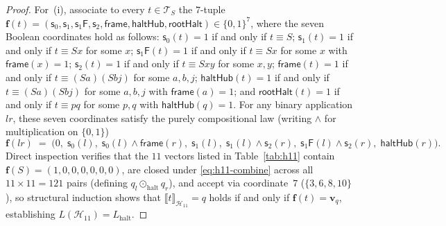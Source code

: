 \documentclass[11pt,reqno]{amsart}
\numberwithin{equation}{section}
\theoremstyle{plain}
\theoremstyle{definition}
\theoremstyle{remark}
\newcommand{\TS}{\mathcal{T}_S}
\newcommand{\sem}[1]{\llbracket #1 \rrbracket}
\begin{document}
\begin{proof}
For~(i), associate to every $t \in \TS$ the $7$-tuple $\mathbf{f}(t) = (\mathsf{s}_0, \mathsf{s}_1, \mathsf{s}_1\mathsf{F}, \mathsf{s}_2, \mathsf{frame}, \mathsf{haltHub}, \mathsf{rootHalt}) \in \{0,1\}^7$, where the seven Boolean coordinates hold as follows: $\mathsf{s}_0(t) = 1$ if and only if $t \equiv S$; $\mathsf{s}_1(t) = 1$ if and only if $t \equiv S x$ for some $x$; $\mathsf{s}_1\mathsf{F}(t) = 1$ if and only if $t \equiv S x$ for some $x$ with $\mathsf{frame}(x) = 1$; $\mathsf{s}_2(t) = 1$ if and only if $t \equiv S x y$ for some $x, y$; $\mathsf{frame}(t) = 1$ if and only if $t \equiv (S a)(S b j)$ for some $a, b, j$; $\mathsf{haltHub}(t) = 1$ if and only if $t \equiv (S a)(S b j)$ for some $a, b, j$ with $\mathsf{frame}(a) = 1$; and $\mathsf{rootHalt}(t) = 1$ if and only if $t \equiv p q$ for some $p, q$ with $\mathsf{haltHub}(q) = 1$. For any binary application $l r$, these seven coordinates satisfy the purely compositional law (writing $\land$ for multiplication on $\{0,1\}$)
\begin{equation}\label{eq:h11-combine}
  \mathbf{f}(l r) \;=\; \bigl(0,\; \mathsf{s}_0(l),\; \mathsf{s}_0(l)\land\mathsf{frame}(r),\; \mathsf{s}_1(l),\; \mathsf{s}_1(l)\land\mathsf{s}_2(r),\; \mathsf{s}_1\mathsf{F}(l)\land\mathsf{s}_2(r),\; \mathsf{haltHub}(r)\bigr).
\end{equation}
Direct inspection verifies that the $11$ vectors listed in Table~\ref{tab:h11} contain $\mathbf{f}(S) = (1,0,0,0,0,0,0)$, are closed under \eqref{eq:h11-combine} across all $11 \times 11 = 121$ pairs (defining $q_l \odot_{\mathrm{halt}} q_r$), and accept via coordinate~$7$ ($\{3,6,8,10\}$), so structural induction shows that $\sem{t}_{\mathcal{H}_{11}} = q$ holds if and only if $\mathbf{f}(t) = \mathbf{v}_q$, establishing $L(\mathcal{H}_{11}) = L_{\mathrm{halt}}$.


\end{proof}
\end{document}
